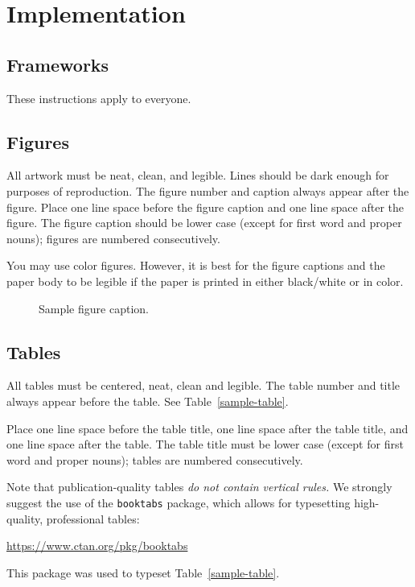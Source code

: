 \documentclass{article}
\begin{document}
\section{Implementation}
\label{sec:implementation}

\subsection{Frameworks}
\label{subsec:frameworks}

These instructions apply to everyone.

\subsection{Figures}

All artwork must be neat, clean, and legible. Lines should be dark
enough for purposes of reproduction. The figure number and caption
always appear after the figure. Place one line space before the figure
caption and one line space after the figure. The figure caption should
be lower case (except for first word and proper nouns); figures are
numbered consecutively.

You may use color figures. However, it is best for the figure
captions and the paper body to be legible if the paper is printed in
either black/white or in color.
\begin{figure}[h]
    \centering
    \fbox{\rule[-.5cm]{0cm}{4cm} \rule[-.5cm]{4cm}{0cm}}
    \caption{Sample figure caption.}
\end{figure}

\subsection{Tables}

All tables must be centered, neat, clean and legible. The table
number and title always appear before the table. See
Table~\ref{sample-table}.

Place one line space before the table title, one line space after the
table title, and one line space after the table. The table title must
be lower case (except for first word and proper nouns); tables are
numbered consecutively.

Note that publication-quality tables \emph{do not contain vertical
rules.} We strongly suggest the use of the \verb+booktabs+ package,
which allows for typesetting high-quality, professional tables:
\begin{center}
    \url{https://www.ctan.org/pkg/booktabs}
\end{center}
This package was used to typeset Table~\ref{sample-table}.
\end{document}
